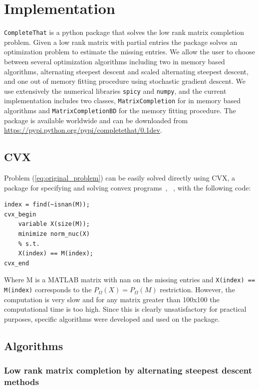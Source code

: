 \documentclass[12pt]{article}
\begin{document}
\section{Implementation}
\texttt{CompleteThat} is a python package that solves the low rank matrix completion problem. Given a low rank matrix with partial entries the package solves an optimization problem to estimate the missing entries. We allow the user to choose between several optimization algorithms including two in memory based algorithms, alternating steepest descent and scaled alternating steepest descent, and one out of memory fitting procedure using stochastic gradient descent. We use extensively the numerical libraries \texttt{spicy} and \texttt{numpy}, and the current implementation includes two classes, \texttt{MatrixCompletion} for in memory based algorithms and \texttt{MatrixCompletionBD} for the memory fitting procedure. The package is available worldwide and can be
downloaded from \url{https://pypi.python.org/pypi/completethat/0.1dev}.

\subsection*{CVX}
Problem (\ref{eq:original_problem}) can be easily solved directly using CVX, a package for specifying and solving convex programs~\cite{cvx}, ~\cite{gb08}, with the following code:

\begin{verbatim}
index = find(~isnan(M));
cvx_begin
    variable X(size(M));
    minimize norm_nuc(X)
    % s.t.
    X(index) == M(index);
cvx_end
\end{verbatim}

Where M is a MATLAB matrix with nan on the missing entries and \texttt{X(index) == M(index)} corresponds to the $P_{\Omega}(X) = P_{\Omega}(M)$ restriction. However, the computation is very slow and for any matrix greater than 100x100 the computational time is too high. Since this is clearly unsatisfactory for practical purposes, specific algorithms were developed and used on the package. 

\subsection*{Algorithms}
\subsubsection*{Low rank matrix completion by alternating steepest descent methods}
\end{document}

